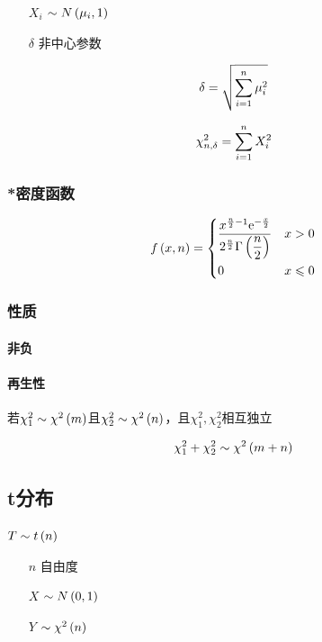 \documentclass{article}
\begin{document}
\begin{enumerate}
    \item [$X_i$] $\sim N\left(\mu_i,1\right)$
    \item [$\delta$] 非中心参数
\end{enumerate}

\[\delta=\sqrt{\sum\limits_{i=1}^n\mu_i^2}\]

\[\chi_{n,\delta}^2=\sum\limits_{i=1}^n X_i^2\]

\subsubsection{*密度函数}

\[f\left(x,n\right)=
    \left\{\begin{aligned}
         & \frac{x^{\frac n2-1}\mathrm e^{-\frac x2}}{2^{\frac n2}\Gamma\left(\dfrac n2\right)} &  & x>0         \\
         & 0                                                                    &  & x\leqslant0
    \end{aligned}\right.\]

\subsubsection{性质}

\paragraph{非负}

\paragraph{再生性}

若$\chi_1^2\sim\chi^2\left(m\right)$且$\chi_2^2\sim\chi^2\left(n\right)$，且$\chi_1^2,\chi_2^2$相互独立

\[\chi_1^2+\chi_2^2\sim\chi^2\left(m+n\right)\]

\subsection{t分布}

$T\sim t\left(n\right)$

\begin{enumerate}
    \item [$n$] 自由度
    \item [$X$] $\sim N\left(0,1\right)$
    \item [$Y$] $\sim\chi^2\left(n\right)$
\end{enumerate}
\end{document}
